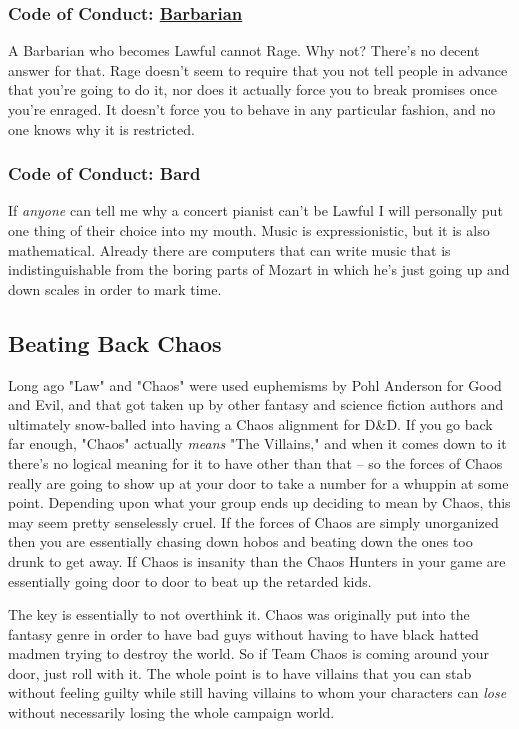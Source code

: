 \subsubsection{Code of Conduct: \hyperref[class:barbarian]{Barbarian}}
A Barbarian who becomes Lawful cannot Rage. Why not? There's no decent answer for that. Rage doesn't seem to require that you not tell people in advance that you're going to do it, nor does it actually force you to break promises once you're enraged. It doesn't force you to behave in any particular fashion, and no one knows why it is restricted.

\subsubsection{Code of Conduct: Bard}
If \textit{anyone} can tell me why a concert pianist can't be Lawful I will personally put one thing of their choice into my mouth. Music is expressionistic, but it is also mathematical. Already there are computers that can write music that is indistinguishable from the boring parts of Mozart in which he's just going up and down scales in order to mark time.

\subsection{Beating Back Chaos}
Long ago "Law" and "Chaos" were used euphemisms by Pohl Anderson for Good and Evil, and that got taken up by other fantasy and science fiction authors and ultimately snow-balled into having a Chaos alignment for D\&D. If you go back far enough, "Chaos" actually \textit{means} "The Villains," and when it comes down to it there's no logical meaning for it to have other than that -- so the forces of Chaos really are going to show up at your door to take a number for a whuppin at some point. Depending upon what your group ends up deciding to mean by Chaos, this may seem pretty senselessly cruel. If the forces of Chaos are simply unorganized then you are essentially chasing down hobos and beating down the ones too drunk to get away. If Chaos is insanity than the Chaos Hunters in your game are essentially going door to door to beat up the retarded kids.

The key is essentially to not overthink it. Chaos was originally put into the fantasy genre in order to have bad guys without having to have black hatted madmen trying to destroy the world. So if Team Chaos is coming around your door, just roll with it. The whole point is to have villains that you can stab without feeling guilty while still having villains to whom your characters can \textit{lose} without necessarily losing the whole campaign world.

